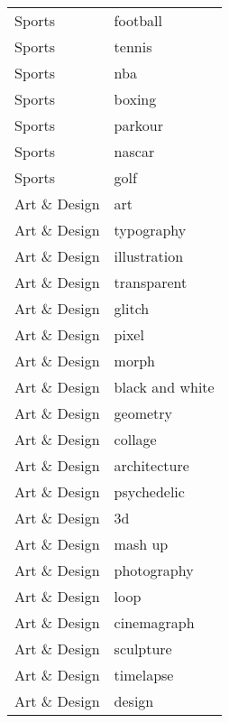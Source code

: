 \begin{supertabular}{l p{0.25\textwidth}}
           Sports &                           football \\
           Sports &                             tennis \\
           Sports &                                nba \\
           Sports &                             boxing \\
           Sports &                            parkour \\
           Sports &                             nascar \\
           Sports &                               golf \\
     Art \& Design &                                art \\
     Art \& Design &                         typography \\
     Art \& Design &                       illustration \\
     Art \& Design &                        transparent \\
     Art \& Design &                             glitch \\
     Art \& Design &                              pixel \\
     Art \& Design &                              morph \\
     Art \& Design &                    black and white \\
     Art \& Design &                           geometry \\
     Art \& Design &                            collage \\
     Art \& Design &                       architecture \\
     Art \& Design &                        psychedelic \\
     Art \& Design &                                 3d \\
     Art \& Design &                            mash up \\
     Art \& Design &                        photography \\
     Art \& Design &                               loop \\
     Art \& Design &                        cinemagraph \\
     Art \& Design &                          sculpture \\
     Art \& Design &                          timelapse \\
     Art \& Design &                             design \\

\end{supertabular}
